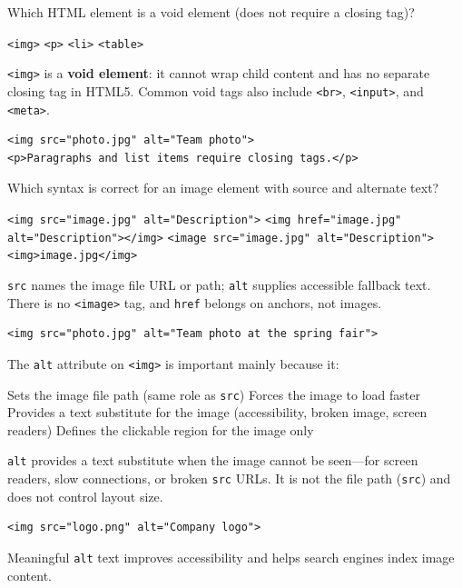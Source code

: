 \question[4]
Which HTML element is a void element (does not require a closing tag)?
\begin{choices}
  \CorrectChoice \texttt{<img>}
  \choice \texttt{<p>}
  \choice \texttt{<li>}
  \choice \texttt{<table>}
\end{choices}
\begin{solution}
  \texttt{<img>} is a \textbf{void element}: it cannot wrap child content and has no separate closing tag in HTML5. Common void tags also include \texttt{<br>}, \texttt{<input>}, and \texttt{<meta>}.
\begin{lstlisting}[style=htmlinline]
<img src="photo.jpg" alt="Team photo">
<p>Paragraphs and list items require closing tags.</p>
\end{lstlisting}
\end{solution}

\question[4]
Which syntax is correct for an image element with source and alternate text?
\begin{choices}
  \CorrectChoice \texttt{<img src="image.jpg" alt="Description">}
  \choice \texttt{<img href="image.jpg" alt="Description"></img>}
  \choice \texttt{<image src="image.jpg" alt="Description">}
  \choice \texttt{<img>image.jpg</img>}
\end{choices}
\begin{solution}
  \texttt{src} names the image file URL or path; \texttt{alt} supplies accessible fallback text. There is no \texttt{<image>} tag, and \texttt{href} belongs on anchors, not images.
\begin{lstlisting}[style=htmlinline]
<img src="photo.jpg" alt="Team photo at the spring fair">
\end{lstlisting}
\end{solution}

\question[4]
The \texttt{alt} attribute on \texttt{<img>} is important mainly because it:
\begin{choices}
  \choice Sets the image file path (same role as \texttt{src})
  \choice Forces the image to load faster
  \CorrectChoice Provides a text substitute for the image (accessibility, broken image, screen readers)
  \choice Defines the clickable region for the image only
\end{choices}
\begin{solution}
  \texttt{alt} provides a text substitute when the image cannot be seen---for screen readers, slow connections, or broken \texttt{src} URLs. It is not the file path (\texttt{src}) and does not control layout size.
\begin{lstlisting}[style=htmlinline]
<img src="logo.png" alt="Company logo">
\end{lstlisting}
  Meaningful \texttt{alt} text improves accessibility and helps search engines index image content.
\end{solution}

